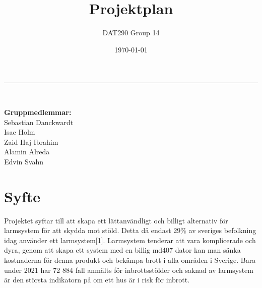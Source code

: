 \documentclass[a4paper]{article}
\title{Projektplan}
\author{DAT290 Group 14}
\date{\today}
\begin{document}
\maketitle
\hrule
\ \\[0.2cm]
\begin{center}
\begin{minipage}{0.5\textwidth}
		\textbf{Gruppmedlemmar:} \\
		Sebastian Danckwardt \\
		Isac Holm \\
		Zaid Haj Ibrahim \\
		Alamin Alreda \\
		Edvin Svahn
\end{minipage}
\end{center}
\clearpage

\tableofcontents
\newpage

\section{Syfte}
Projektet syftar till att skapa ett lättanvändligt och billigt alternativ för larmsystem för att skydda mot stöld. Detta då endast 29\% av sveriges befolkning idag använder ett larmsystem[1]. Larmsystem tenderar att vara komplicerade och dyra, genom att skapa ett system med en billig md407 dator kan man sänka kostnaderna för denna produkt och bekämpa brott i alla områden i Sverige. Bara under 2021 har 72 884 fall anmälts för inbrottsstölder och saknad av larmsystem är den största indikatorn på om ett hus är i risk för inbrott.




\end{document}
